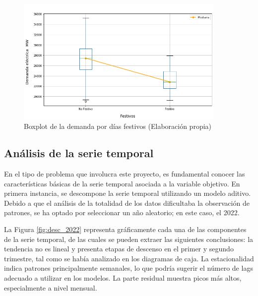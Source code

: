\documentclass[12pt,a4paper]{report}
\begin{document}
\begin{figure}[H]
    \centering
    \includegraphics[width=0.9\textwidth]{Images/tfm-3.5C.png}
    \caption{Boxplot de la demanda por días festivos (Elaboración propia)}
    \label{fig:BX_festivos}
\end{figure}




\subsection{Análisis de la serie temporal}

En el tipo de problema que involucra este proyecto, es fundamental conocer las características básicas de la serie temporal asociada a la variable objetivo. En primera instancia, se descompone la serie temporal utilizando un modelo aditivo. Debido a que el análisis de la totalidad de los datos dificultaba la observación de patrones, se ha optado por seleccionar un año aleatorio; en este caso, el 2022.

La Figura \ref{fig:desc_2022} representa gráficamente cada una de las componentes de la serie temporal, de las cuales se pueden extraer las siguientes conclusiones: la tendencia no es lineal y presenta etapas de descenso en el primer y segundo trimestre, tal como se había analizado en los diagramas de caja. La estacionalidad indica patrones principalmente semanales, lo que podría sugerir el número de lags adecuado a utilizar en los modelos. La parte residual muestra picos más altos, especialmente a nivel mensual.
\end{document}
